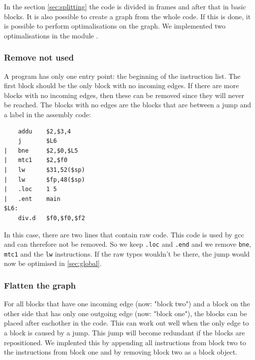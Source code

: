 \lstset{ %
language=[mips]Assembler,         %
}
In the section \ref{sec:splitting} the code is divided in frames and after
that in basic blocks. It is also possible to create a graph from the whole code.
If this is done, it is possible to perform optimalisations on the graph. We 
implemented two optimalisations in the module .
\subsubsection{Remove not used}
A program has only one entry point: the beginning of the instruction list. The 
first block should be the only block with no incoming edges. If there are more
blocks with no incoming edges, then these can be removed since they will never 
be reached. The blocks with no edges are the blocks that are between a jump
and a label in the assembly code:
\begin{lstlisting}
    addu    $2,$3,4
    j       $L6
|   bne     $2,$0,$L5
|   mtc1    $2,$f0
|   lw      $31,52($sp)
|   lw      $fp,48($sp)
|   .loc    1 5
|   .ent    main        
$L6:
    div.d   $f0,$f0,$f2	
\end{lstlisting}
In this case, there are two lines that contain raw code. This code is used by
gcc and can therefore not be removed. So we keep \texttt{.loc} and \texttt{.end} 
and we remove \texttt{bne}, \texttt{mtc1} and the \texttt{lw} instructions. If
the raw types wouldn't be there, the jump would now be optimised in 
\ref{sec:global}.
\subsubsection{Flatten the graph}
For all blocks that have one incoming edge (now: "block two") and a block on the 
other side that has only one outgoing edge (now: "block one"), the blocks can 
be placed after eachother in the code. This can work out well when the only 
edge to a block is caused by a jump. This jump will become redundant if the 
blocks are repositioned. We implented this by appending all instructions from 
block two to the instructions from block one and by removing block two as a 
block object. 
